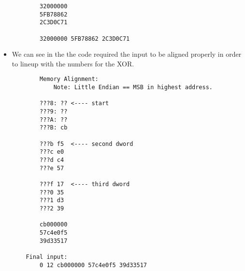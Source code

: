 \documentclass{article}
\begin{document}
\begin{itemize}
\begin{small}
\begin{verbatim}
		32000000
		5FB78862
		2C3D0C71

		32000000 5FB78862 2C3D0C71
    \end{verbatim}\end{small}
    \item We can see in the the code required the input to be aligned properly in order to lineup with the numbers for the XOR.
	\begin{small}\begin{verbatim}
        Memory Alignment:
			Note: Little Endian == MSB in highest address.

		???8: ?? <---- start
		???9: ??
		???A: ??
		???B: cb

		???b f5  <---- second dword
		???c e0
		???d c4
		???e 57

		???f 17  <---- third dword
		???0 35
		???1 d3
		???2 39

		cb000000
		57c4e0f5
		39d33517

	Final input:
		0 12 cb000000 57c4e0f5 39d33517
    \end{verbatim}\end{small}
\end{itemize}
\end{document}
